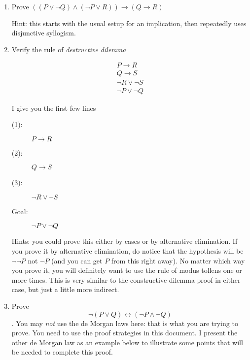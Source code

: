 \documentclass[12pt]{article}
\begin{document}
\begin{enumerate}

\item Prove $((P \vee \neg Q) \wedge (\neg P \vee R)) \rightarrow (Q \rightarrow R)$

Hint:  this starts with the usual setup for an implication, then repeatedly uses disjunctive syllogism.

\item Verify the rule of {\em destructive dilemma\/}

$$\begin{array}{c}

P \rightarrow R\\

Q \rightarrow S \\

\neg R \vee \neg S \\ \hline

\neg P \vee \neg Q

\end{array}$$

I give you the first few lines

\begin{description}

\item[(1):]  $P \rightarrow R$

\item[(2):]  $Q \rightarrow S$

\item[(3):]  $\neg R \vee \neg S$

\item[Goal:]  $\neg P \vee \neg Q$

\end{description}

Hints:  you could prove this either by cases or by alternative elimination.  If you prove it by alternative elimination, do notice
that the hypothesis will be $\neg\neg P$ not $\neg P$ (and you can get $P$ from this right away).  No matter which way you prove it,
you will definitely want to use the rule of modus tollens one or more times.  This is very similar to the constructive dilemma proof in either case, but just a little more indirect.

\item  Prove $$\neg(P \vee Q) \leftrightarrow (\neg P \wedge \neg Q)$$.  You may {\em not\/} use the de Morgan laws here:  that is what you are trying to prove.  You need to use the proof strategies in this document.  I present the other de Morgan law as an example below  to illustrate some points that will be needed to complete this proof.

\end{enumerate}
\end{document}
